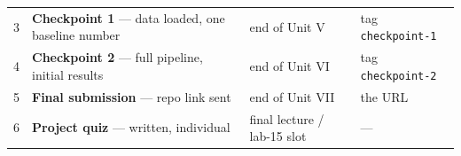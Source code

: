 \documentclass[11pt]{article}
\begin{document}
{\begin{longtable}[]{@{}llll@{}}
\begin{minipage}[t]{0.22\columnwidth}
3\strut
\end{minipage} & \begin{minipage}[t]{0.22\columnwidth}\raggedright
\textbf{Checkpoint 1} --- data loaded, one baseline number\strut
\end{minipage} & \begin{minipage}[t]{0.22\columnwidth}\raggedright
end of Unit V\strut
\end{minipage} & \begin{minipage}[t]{0.22\columnwidth}\raggedright
tag \texttt{checkpoint-1}\strut
\end{minipage}\tabularnewline
\begin{minipage}[t]{0.22\columnwidth}\raggedright
4\strut
\end{minipage} & \begin{minipage}[t]{0.22\columnwidth}\raggedright
\textbf{Checkpoint 2} --- full pipeline, initial results\strut
\end{minipage} & \begin{minipage}[t]{0.22\columnwidth}\raggedright
end of Unit VI\strut
\end{minipage} & \begin{minipage}[t]{0.22\columnwidth}\raggedright
tag \texttt{checkpoint-2}\strut
\end{minipage}\tabularnewline
\begin{minipage}[t]{0.22\columnwidth}\raggedright
5\strut
\end{minipage} & \begin{minipage}[t]{0.22\columnwidth}\raggedright
\textbf{Final submission} --- repo link sent\strut
\end{minipage} & \begin{minipage}[t]{0.22\columnwidth}\raggedright
end of Unit VII\strut
\end{minipage} & \begin{minipage}[t]{0.22\columnwidth}\raggedright
the URL\strut
\end{minipage}\tabularnewline
\begin{minipage}[t]{0.22\columnwidth}\raggedright
6\strut
\end{minipage} & \begin{minipage}[t]{0.22\columnwidth}\raggedright
\textbf{Project quiz} --- written, individual\strut
\end{minipage} & \begin{minipage}[t]{0.22\columnwidth}\raggedright
final lecture / lab-15 slot\strut
\end{minipage} & \begin{minipage}[t]{0.22\columnwidth}\raggedright
---\strut
\end{minipage}\tabularnewline
\bottomrule
\end{longtable}
}
\end{document}
